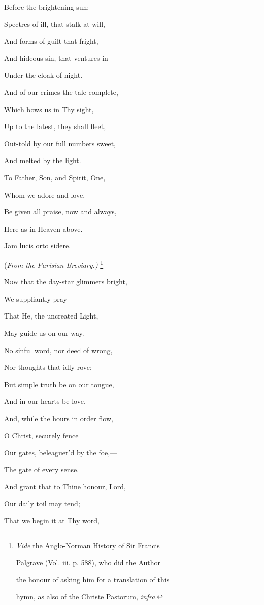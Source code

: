 Before the
brightening sun;

Spectres of ill, that stalk at will,

And forms of guilt
that fright,

And hideous sin, that ventures in

Under the cloak of
night.

And of our crimes the tale complete,

Which bows us in
Thy sight,

Up to the latest, they shall fleet,

Out-told by our full numbers sweet,

And melted by the
light. 

To Father, Son, and Spirit, One,

Whom we adore and
love,

Be given all praise, now and always,

Here as in Heaven
above.


Jam lucis orto sidere.

(\emph{From the Parisian Breviary.)}
\footnote{\emph{Vide} the Anglo-Norman History of Sir Francis

Palgrave
(Vol. iii. p. 588), who did the Author

the honour of
asking him for a translation of this

hymn, as also of the
Christe Pastorum, \emph{infra}.}

N\textsc{ow} that the day-star glimmers bright,

We suppliantly pray

That He, the uncreated Light,

May guide us on our way.

No sinful word, nor deed of wrong,

Nor thoughts that idly rove;

But simple truth be on our tongue,

And in our hearts be love.

And, while the hours in order flow,

O Christ, securely fence

Our gates, beleaguer'd by the foe,—

The gate of every sense. 

And grant that to Thine honour, Lord,

Our daily toil may tend;

That we begin it at Thy word,

